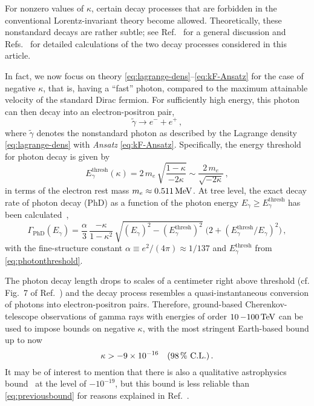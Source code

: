 \documentclass[aps,prd,preprint,longbibliography]{revtex4-1}
\begin{document}
For nonzero values of $\kappa$, certain decay processes that are
forbidden in the conventional Lorentz-invariant theory become
allowed.
Theoretically, these nonstandard decays are rather
subtle; see Ref.~\cite{KaufholdKlinkhamer2005}
for a general discussion
and Refs.~\cite{KlinkhamerSchreck2008,DiazKlinkhamer2015,Klinkhamer2016}
for detailed calculations of the two decay processes considered in this article.

In fact, we now focus on
theory \eqref{eq:lagrange-dens}--\eqref{eq:kF-Ansatz}
for the case of negative $\kappa$, that is, having
a ``fast'' photon, compared to the maximum
attainable velocity of the standard Dirac fermion.
For sufficiently high energy, this photon can then decay
into an electron-positron pair,
\begin{equation}
\label{eq:photon-decay}
\widetilde{\gamma}\to e^{-} + e^{+}\,,
\end{equation}
where $\widetilde{\gamma}$ denotes the nonstandard photon
as described by the Lagrange density \eqref{eq:lagrange-dens}
with \textit{Ansatz} \eqref{eq:kF-Ansatz}.
Specifically, the energy threshold for photon decay
is given by~\cite{KlinkhamerSchreck2008}
\begin{equation}
E^\text{thresh}_\gamma(\kappa) = 2\,m_e\,\sqrt{\frac{1-\kappa}{-2\kappa}}
\sim
\frac{2\,m_e}{\sqrt{-2\kappa}}\,,
\label{eq:photonthreshold}
\end{equation}
in terms of the electron rest mass $m_e \approx \unit[0.511]{MeV}$.
At tree level, the exact decay rate of photon
decay (PhD) as a function of the photon energy $E_\gamma \geq
E^\text{thresh}_\gamma$ has been
calculated~\cite{KlinkhamerSchreck2008,DiazKlinkhamer2015},
\begin{equation}
\Gamma_\text{PhD}(E_\gamma) = \frac{\alpha}{3}\,
\frac{-\kappa}{1-\kappa^2}\,
\sqrt{(E_\gamma)^2-(E^\text{thresh}_\gamma)^2}\;
\Big(2+(E^\text{thresh}_\gamma/E_\gamma)^2\Big)\,,
\label{eq:photondecayrate}
\end{equation}
with the fine-structure constant $\alpha \equiv e^2/(4\pi) \approx 1/137$
and $E^\text{thresh}_\gamma$ from \eqref{eq:photonthreshold}.

The photon decay length drops to scales of a centimeter
right above threshold (cf. Fig.~7 of Ref.~\cite{DiazKlinkhamer2015})
and the decay process resembles a quasi-instantaneous conversion
of photons into electron-positron pairs.
Therefore, ground-based Cherenkov-telescope observations
of gamma rays with energies of order $\unit[10]-\unit[100]{TeV}$
can be used to impose bounds on negative $\kappa$,
with the most stringent Earth-based bound up to now~\cite{KlinkhamerSchreck2008}
\begin{equation}
\label{eq:previousbound}
\kappa > -9 \times 10^{-16} ~~~  \text{($\unit[98]{\%}$ C.L.)}\,.
\end{equation}
It may be of interest to mention that there is also
a qualitative astrophysics bound~\cite{Altschul2005}
at the level of $-10^{-19}$, but this bound is less reliable
than \eqref{eq:previousbound} for reasons explained
in Ref.~\cite{DiazKlinkhamerRisse2016}.
\end{document}
